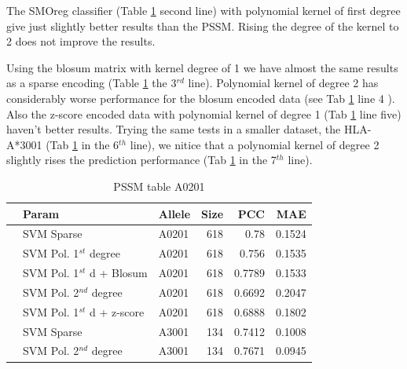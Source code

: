 The SMOreg classifier (Table \ref{tab:svm1} second line) with polynomial kernel of first degree give just slightly better results than the PSSM. Rising the degree of the kernel to 2 does not improve the results.

Using the blosum matrix with kernel degree of 1 we have almost the same results as a sparse encoding (Table \ref{tab:svm1} the 3$^{rd}$ line). Polynomial kernel of degree 2 has considerably worse performance for the blosum encoded data (see Tab \ref{tab:svm1} line 4 ). Also the z-score encoded data with polynomial kernel of degree 1 (Tab \ref{tab:svm1} line five) haven't better results.
Trying the same tests in a smaller dataset, the HLA-A*3001 (Tab \ref{tab:svm1} in the 6$^{th}$ line), we nitice that a polynomial kernel of degree 2 slightly rises the prediction performance (Tab \ref{tab:svm1} in the 7$^{th}$ line).

\begin{table}[ht]
\begin{center}
\begin{tabular}{rllrrr}
  \hline
 & Param & Allele & Size & PCC & MAE \\ 
  \hline
 & SVM Sparse & A0201 &   618 & 0.78 & 0.1524 \\ 
 & SVM Pol. 1$^{st}$ degree & A0201 &   618 & 0.756 & 0.1535 \\ 
 & SVM Pol. 1$^{st}$ d + Blosum & A0201 &   618 & 0.7789 & 0.1533 \\ 
 & SVM Pol. 2$^{nd}$ degree & A0201 &   618 & 0.6692 & 0.2047 \\ 
 & SVM Pol. 1$^{st}$ d + z-score & A0201 &   618 & 0.6888 & 0.1802 \\ 
 & SVM Sparse & A3001 &   134 & 0.7412 & 0.1008 \\ 
 & SVM Pol. 2$^{nd}$ degree & A3001 &   134 & 0.7671 & 0.0945 \\ 
   \hline
\end{tabular}
\end{center}
\caption{PSSM table A0201}\label{tab:svm1}
\end{table}


